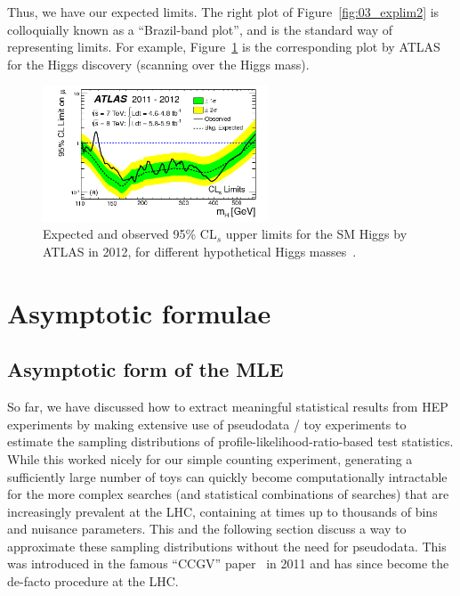 Thus, we have our expected limits.
The right plot of Figure~\ref{fig:03_explim2} is colloquially known as a ``Brazil-band plot'', and is the standard way of representing limits.
For example, Figure~\ref{fig:03_atlas_higgs} is the corresponding plot by ATLAS for the Higgs discovery (scanning over the Higgs mass).

\begin{figure}[htb]
\centering
\includegraphics[width=0.6\textwidth]{figures/03-Stats/04-expected/atlas_limits.png}
\caption{Expected and observed 95\% CL$_s$ upper limits for the SM Higgs by ATLAS in 2012, for different hypothetical Higgs masses~\cite{ATLAS:2012yve}.}
\label{fig:03_atlas_higgs}
\end{figure}


\section{Asymptotic formulae}
\label{sec:03_asymptotic}

\subsection{Asymptotic form of the MLE}
\label{sec:03_asymptotic_mle}

So far, we have discussed how to extract meaningful statistical results from HEP experiments by making extensive use of pseudodata / toy experiments to estimate the sampling distributions of profile-likelihood-ratio-based test statistics.
While this worked nicely for our simple counting experiment, generating a sufficiently large number of toys can quickly become computationally intractable for the more complex searches (and statistical combinations of searches) that are increasingly prevalent at the LHC, containing at times up to thousands of bins and nuisance parameters.
This and the following section discuss a way to approximate these sampling distributions without the need for pseudodata.
This was introduced in the famous ``CCGV'' paper~\cite{Cowan:2010js} in 2011 and has since become the de-facto procedure at the LHC.

